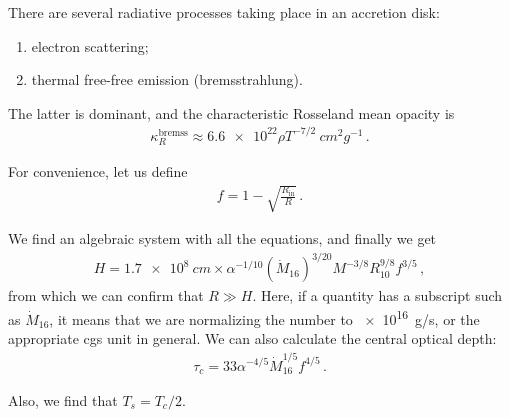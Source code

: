 \documentclass[main.tex]{subfiles}
\begin{document}
There are several radiative processes taking place in an accretion disk: 
\begin{enumerate}
    \item electron scattering;
    \item thermal free-free emission (bremsstrahlung).
\end{enumerate}

The latter is dominant, and the characteristic Rosseland mean opacity is 
%
\begin{align}
\kappa _R^{\text{bremss}} \approx \num{6.6e22} \rho T^{-7/2} \SI{}{cm^2 g^{-1}}
\,.
\end{align}

For convenience, let us define 
%
\begin{align}
f = 1 - \sqrt{ \frac{R _{\text{in}}}{R}}
\,.
\end{align}

We find an algebraic system with all the equations, and finally we get 
%
\begin{align}
H = \SI{1.7e8}{cm} \times \alpha^{-1/10} (\dot{M}_{16})^{3/20} M^{-3/8} R_{10}^{9/8} f^{3/5}
\,,
\end{align}
%
from which we can confirm that \(R \gg H\).
Here, if a quantity has a subscript such as \(\dot{M}_{16}\), it means that we are normalizing the number to \SI{e16}{g/s}, or the appropriate cgs unit in general.
We can also calculate the central optical depth: 
%
\begin{align}
\tau _c = 33 \alpha^{-4/5} \dot{M}_{16}^{1/5} f^{4/5}
\,.
\end{align}

Also, we find that \(T_s = T_c / 2\). 
\end{document}
